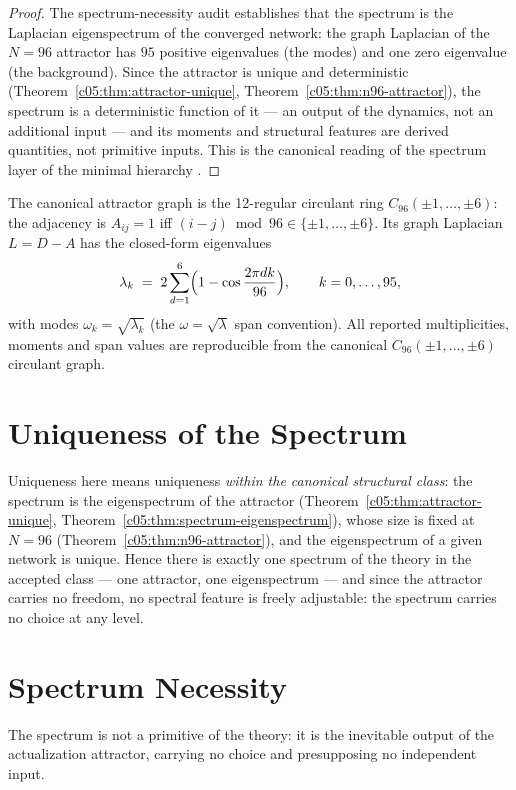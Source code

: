 \begin{proof}
The spectrum-necessity audit \cite{c05:QG295} establishes that the spectrum is the Laplacian
eigenspectrum of the converged network: the graph Laplacian of the $N=96$ attractor has
$95$ positive eigenvalues (the modes) and one zero eigenvalue (the background). Since the
attractor is unique and deterministic (Theorem~\ref{c05:thm:attractor-unique},
Theorem~\ref{c05:thm:n96-attractor}), the spectrum is a deterministic function of it --- an
output of the dynamics, not an additional input --- and its moments and structural features
are derived quantities, not primitive inputs. This is the canonical reading of the spectrum
layer of the minimal hierarchy \cite{c05:QG294}.
\end{proof}

The canonical attractor graph is the 12-regular circulant ring
$C_{96}(\pm1,\ldots,\pm6)$: the adjacency is $A_{ij}=1$ iff
$(i-j)\bmod 96 \in \{\pm1,\ldots,\pm6\}$. Its graph Laplacian $L=D-A$ has the closed-form
eigenvalues
\[
\lambda_k \;=\; 2\sum_{d=1}^{6}\Bigl(1-\cos\frac{2\pi dk}{96}\Bigr), \qquad k=0,\ldots,95,
\]
with modes $\omega_k=\sqrt{\lambda_k}$ (the $\omega=\sqrt{\lambda}$ span convention). All
reported multiplicities, moments and span values are reproducible from the canonical
$C_{96}(\pm1,\ldots,\pm6)$ circulant graph.

\section{Uniqueness of the Spectrum}
\label{c05:sec:spectrum-uniqueness}

Uniqueness here means uniqueness \emph{within the canonical structural class}: the spectrum is
the eigenspectrum of the attractor (Theorem~\ref{c05:thm:attractor-unique},
Theorem~\ref{c05:thm:spectrum-eigenspectrum}), whose size is fixed at $N=96$
(Theorem~\ref{c05:thm:n96-attractor}), and the eigenspectrum of a given network is unique.
Hence there is exactly one spectrum of the theory in the accepted class --- one attractor,
one eigenspectrum --- and since the attractor carries no freedom, no spectral feature is
freely adjustable: the spectrum carries no choice at any level.

\section{Spectrum Necessity}
\label{c05:sec:spectrum-necessity}

\begin{theorem}
\label{c05:thm:spectrum-not-primitive}
The spectrum is not a primitive of the theory: it is the inevitable output of the
actualization attractor, carrying no choice and presupposing no independent input.
\end{theorem}


